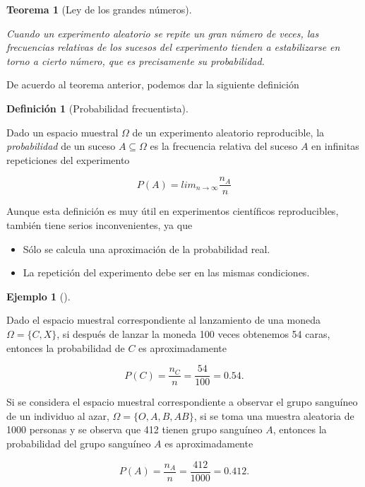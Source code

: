 \documentclass[
  a4paper,
]{scrreport}
\providecommand{\tightlist}{%
  \setlength{\itemsep}{0pt}\setlength{\parskip}{0pt}}\usepackage{longtable,booktabs,array}
\theoremstyle{plain}
\newtheorem{theorem}{Teorema}[chapter]
\theoremstyle{definition}
\newtheorem{example}{Ejemplo}[chapter]
\theoremstyle{definition}
\newtheorem{definition}{Definición}[chapter]
\theoremstyle{remark}
\begin{document}
\begin{theorem}[Ley de los grandes
números]\protect\hypertarget{thm-ley-grandes-numeros}{}\label{thm-ley-grandes-numeros}

Cuando un experimento aleatorio se repite un gran número de veces, las
frecuencias relativas de los sucesos del experimento tienden a
estabilizarse en torno a cierto número, que es precisamente su
probabilidad.

\end{theorem}

De acuerdo al teorema anterior, podemos dar la siguiente definición

\begin{definition}[Probabilidad
frecuentista]\protect\hypertarget{def-probabilidad-frecuentista}{}\label{def-probabilidad-frecuentista}

Dado un espacio muestral \(\Omega\) de un experimento aleatorio
reproducible, la \emph{probabilidad} de un suceso \(A\subseteq \Omega\)
es la frecuencia relativa del suceso \(A\) en infinitas repeticiones del
experimento

\[P(A) = lim_{n\rightarrow \infty}\frac{n_{A}}{n}\]

\end{definition}

Aunque esta definición es muy útil en experimentos científicos
reproducibles, también tiene serios inconvenientes, ya que

\begin{itemize}
\tightlist
\item
  Sólo se calcula una aproximación de la probabilidad real.
\item
  La repetición del experimento debe ser en las mismas condiciones.
\end{itemize}

\begin{example}[]\protect\hypertarget{exm-probabilidad-frecuentista}{}\label{exm-probabilidad-frecuentista}

Dado el espacio muestral correspondiente al lanzamiento de una moneda
\(\Omega=\{C,X\}\), si después de lanzar la moneda 100 veces obtenemos
54 caras, entonces la probabilidad de \(C\) es aproximadamente

\[P(C) = \frac{n_C}{n} = \frac{54}{100} = 0.54.\]

Si se considera el espacio muestral correspondiente a observar el grupo
sanguíneo de un individuo al azar, \(\Omega=\{O,A,B,AB\}\), si se toma
una muestra aleatoria de 1000 personas y se observa que 412 tienen grupo
sanguíneo \(A\), entonces la probabilidad del grupo sanguíneo \(A\) es
aproximadamente

\[P(A) = \frac{n_A}{n} = \frac{412}{1000} = 0.412.\]

\end{example}
\end{document}
